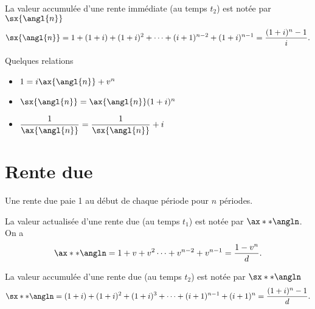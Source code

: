 La valeur accumulée d'une rente immédiate (au temps \textcolor{dlblue}{$t_2$}) est notée par $\sx{\angl{n}}$
$$\sx{\angl{n}} = 1 + (1+i) + (1+i)^2+ \dots + (i+1)^{n-2} + (1+i)^{n-1} = \frac{(1+i)^n - 1}{i}.$$

Quelques relations 
\begin{multicols}{3}
	\begin{itemize}
		\item $1 = i\ax{\angl{n}} + v^n$
		\item $\sx{\angl{n}} = \ax{\angl{n}} (1+i)^n$
		\item $\displaystyle \frac{1}{\ax{\angl{n}}} = \frac{1}{\sx{\angl{n}}} + i$
	\end{itemize}
\end{multicols}

\section{Rente due}

Une rente due paie 1 au début de chaque période pour $n$ périodes. 

\begin{center}
\end{center}

La valeur actualisée d'une rente due (au temps \textcolor{dlblue}{$t_1$}) est notée par $\ax**{\angln}$. On a 
$$\ax**{\angln} = 1 + v + v^2 \dots + v^{n-2} + v^{n-1} = \frac{1 - v^n}{d}.$$

La valeur accumulée d'une rente due (au temps \textcolor{dlblue}{$t_2$}) est notée par $\sx**{\angln}$
$$\sx**{\angln} = (1+i) + (1+i)^2 + (1+i)^3 + \dots + (i+1)^{n-1} + (i+1)^{n} = \frac{(1+i)^n - 1}{d}.$$

